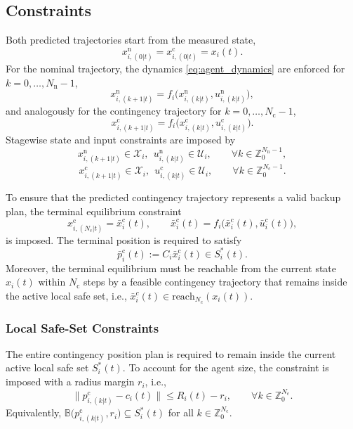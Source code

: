 \documentclass[twocolumn]{autart}
\begin{document}
\subsection{Constraints}
\label{subsec:dcmpc_constraints}
Both predicted trajectories start from the measured state,
\begin{equation}
x^{\mathrm{n}}_{i,(0|t)} = x^{\mathrm{c}}_{i,(0|t)} = x_i(t).
\label{eq:init_both}
\end{equation}
For the nominal trajectory, the dynamics \eqref{eq:agent_dynamics} are enforced for
$k=0,\ldots,N_{\mathrm{n}}-1$,
\[
x^{\mathrm{n}}_{i,(k+1|t)} = f_i\big(x^{\mathrm{n}}_{i,(k|t)}, u^{\mathrm{n}}_{i,(k|t)}\big),
\]
and analogously for the contingency trajectory for $k=0,\ldots,N_{\mathrm{c}}-1$,
\[
x^{\mathrm{c}}_{i,(k+1|t)} = f_i\big(x^{\mathrm{c}}_{i,(k|t)}, u^{\mathrm{c}}_{i,(k|t)}\big).
\]
Stagewise state and input constraints are imposed by
\[
x^{\mathrm{n}}_{i,(k+1|t)}\in\mathcal{X}_i,\ \ u^{\mathrm{n}}_{i,(k|t)}\in\mathcal{U}_i,
\qquad \forall k\in\mathbb{Z}_0^{N_{\mathrm{n}}-1},
\]
\[
x^{\mathrm{c}}_{i,(k+1|t)}\in\mathcal{X}_i,\ \ u^{\mathrm{c}}_{i,(k|t)}\in\mathcal{U}_i,
\qquad \forall k\in\mathbb{Z}_0^{N_{\mathrm{c}}-1}.
\]

To ensure that the predicted contingency trajectory represents a valid backup plan, the terminal equilibrium constraint
\begin{equation}
x^{\mathrm{c}}_{i,(N_{\mathrm{c}}|t)} = \bar{x}^{\mathrm{c}}_i(t),
\qquad
\bar{x}^{\mathrm{c}}_i(t) = f_i\big(\bar{x}^{\mathrm{c}}_i(t), \bar{u}^{\mathrm{c}}_i(t)\big),
\label{eq:terminal_steady_state}
\end{equation}
is imposed.
The terminal position is required to satisfy
\[
\bar{p}^{\mathrm{c}}_i(t) := C_i\bar{x}^{\mathrm{c}}_i(t)\in S_i^\ast(t).
\]
Moreover, the terminal equilibrium must be reachable from the current state $x_i(t)$ within $N_{\mathrm{c}}$ steps by a feasible contingency trajectory that remains inside the active local safe set, i.e.,
\(
\bar{x}_i^c(t) \in \mathrm{reach}_{N_c}(x_i(t)).
\)

\subsubsection{Local Safe-Set Constraints}

The entire contingency position plan is required to remain inside the current active local safe set \(S_i^\ast(t)\). To account for the agent size, the constraint is imposed with a radius margin \(r_i\), i.e.,
\begin{equation}
\|p^{\mathrm{c}}_{i,(k|t)} - c_i(t)\| \le R_i(t) - r_i,
\qquad \forall k\in\mathbb{Z}_0^{N_{\mathrm{c}}}.
\label{eq:contingency_plan_in_active_safe_set}
\end{equation}
Equivalently, \(\mathbb{B}\bigl(p^{\mathrm{c}}_{i,(k|t)},r_i\bigr)\subseteq S_i^\ast(t)\) for all
\(k\in\mathbb{Z}_0^{N_{\mathrm{c}}}\).
\end{document}
